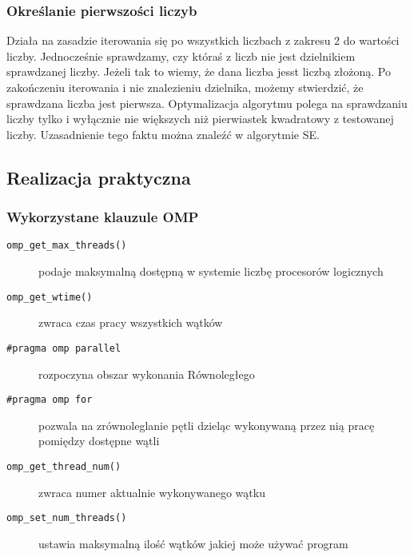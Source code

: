 \documentclass{article}
\begin{document}
            \subsubsection{Określanie pierwszości liczyb}
                Działa na zasadzie iterowania się po wszystkich liczbach z zakresu 2 do wartości liczby. Jednocześnie sprawdzamy, czy któraś z liczb nie jest dzielnikiem sprawdzanej liczby. Jeżeli tak to wiemy, że dana liczba jesst liczbą złożoną. Po zakończeniu iterowania i nie znalezieniu dzielnika, możemy stwierdzić, że sprawdzana liczba jest pierwsza. Optymalizacja algorytmu polega na sprawdzaniu liczby tylko i wyłącznie nie większych niż pierwiastek kwadratowy z testowanej liczby. Uzasadnienie tego faktu można znaleźć w algorytmie \gls{SE}.
        \subsection{Realizacja praktyczna}
            \subsubsection{Wykorzystane klauzule OMP}
                \begin{description}
                    \item[\texttt{omp\_get\_max\_threads()}] podaje maksymalną dostępną w systemie liczbę procesorów logicznych
                    \item[\texttt{omp\_get\_wtime()}] zwraca czas pracy wszystkich wątków
                    \item[\texttt{\#pragma\ omp\ parallel}] rozpoczyna obszar wykonania Równoległego
                    \item[\texttt{\#pragma\ omp\ for}] pozwala na zrównoleglanie pętli dzieląc wykonywaną przez nią pracę pomiędzy dostępne wątli 
                    \item[\texttt{omp\_get\_thread\_num()}] zwraca numer aktualnie wykonywanego wątku
                    \item[\texttt{omp\_set\_num\_threads()}] ustawia maksymalną ilość wątków jakiej może używać program
                    \item[]   
                \end{description}
                
    
    \clearpage
    \printnoidxglossaries
\end{document}
